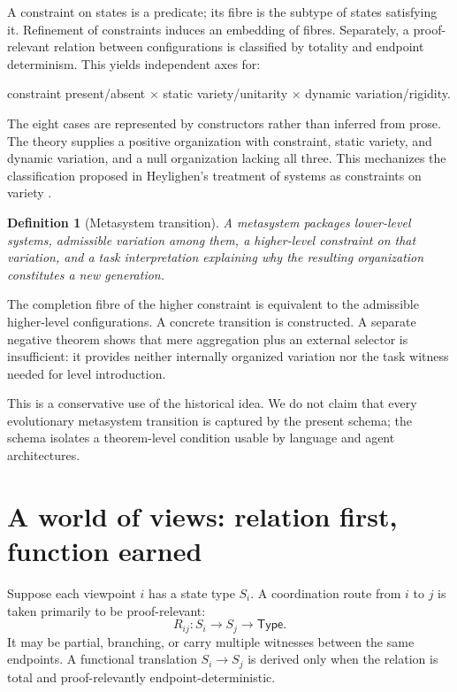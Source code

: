 \documentclass[11pt]{article}
\newtheorem{definition}[theorem]{Definition}
\begin{document}
A constraint on states is a predicate; its fibre is the subtype of states satisfying
it.  Refinement of constraints induces an embedding of fibres.  Separately, a
proof-relevant relation between configurations is classified by totality and endpoint
determinism.  This yields independent axes for:

\begin{center}
constraint present/absent $\times$ static variety/unitarity $\times$
dynamic variation/rigidity.
\end{center}

The eight cases are represented by constructors rather than inferred from prose.
The theory supplies a positive organization with constraint, static variety, and
dynamic variation, and a null organization lacking all three.  This mechanizes the
classification proposed in Heylighen's treatment of systems as constraints on
variety \cite{heylighen1995}.

\begin{definition}[Metasystem transition]
A metasystem packages lower-level systems, admissible variation among them, a
higher-level constraint on that variation, and a task interpretation explaining why
the resulting organization constitutes a new generation.
\end{definition}

The completion fibre of the higher constraint is equivalent to the admissible
higher-level configurations.  A concrete transition is constructed.  A separate
negative theorem shows that mere aggregation plus an external selector is
insufficient: it provides neither internally organized variation nor the task witness
needed for level introduction.

This is a conservative use of the historical idea.  We do not claim that every
evolutionary metasystem transition is captured by the present schema; the schema
isolates a theorem-level condition usable by language and agent architectures.

\section{A world of views: relation first, function earned}

Suppose each viewpoint $i$ has a state type $S_i$.  A coordination route from $i$ to
$j$ is taken primarily to be proof-relevant:
\[
  R_{ij} : S_i \to S_j \to \mathsf{Type}.
\]
It may be partial, branching, or carry multiple witnesses between the same endpoints.
A functional translation $S_i\to S_j$ is derived only when the relation is total and
proof-relevantly endpoint-deterministic.
\end{document}
